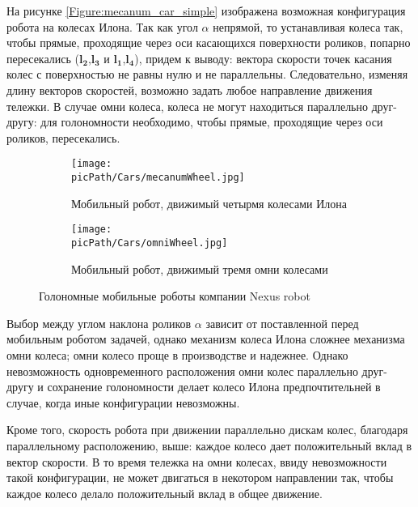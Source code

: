 \documentclass[oneside,final,14pt]{extreport}
\newcommand{\picPath}{img}
\newcommand{\bs}{\boldsymbol}
\begin{document}
На рисунке \ref{Figure:mecanum_car_simple} изображена возможная конфигурация робота на колесах Илона. Так как угол $\alpha$ непрямой, то устанавливая колеса так, чтобы прямые, проходящие через оси касающихся поверхности роликов, попарно пересекались ($\bs{l_{2}}$,$\bs{l_{3}}$ и $\bs{l_{1}}$,$\bs{l_{4}}$), придем к выводу: вектора скорости точек касания колес с поверхностью не равны нулю и не параллельны. Следовательно, изменяя длину векторов скоростей, возможно задать любое направление движения тележки. В случае омни колеса, колеса не могут находиться параллельно друг-другу: для голономности необходимо, чтобы прямые, проходящие через оси роликов, пересекались. 

\begin{figure}[H]
\end{figure}

\begin{figure}[H]
  \centering
  \begin{subfigure}[b]{0.4\linewidth}
   \texttt{[image: \\picPath/Cars/mecanumWheel.jpg]}
    \caption{ Мобильный робот, движимый четырмя колесами Илона }
  \end{subfigure}
  \begin{subfigure}[b]{0.4\linewidth}
    \texttt{[image: \\picPath/Cars/omniWheel.jpg]}
    \caption{ Мобильный робот, движимый тремя омни колесами }
  \end{subfigure}
  \caption{ Голономные мобильные роботы компании Nexus robot}
  \label{Figure:holonomicRobots}
\end{figure}
Выбор между углом наклона роликов $\alpha$ зависит от поставленной перед мобильным роботом задачей, однако механизм колеса Илона сложнее механизма омни колеса; омни колесо проще в производстве и надежнее. Однако невозможность одновременного расположения омни колес параллельно друг-другу и сохранение голономности делает колесо Илона предпочтительней в случае, когда иные конфигурации невозможны.  

Кроме того, скорость робота при движении параллельно дискам колес, благодаря параллельному расположению, выше: каждое колесо дает положительный вклад в вектор скорости. В то время тележка на омни колесах, ввиду невозможности такой конфигурации, не может двигаться в некотором направлении так, чтобы каждое колесо делало положительный вклад в общее движение.   
\end{document}
